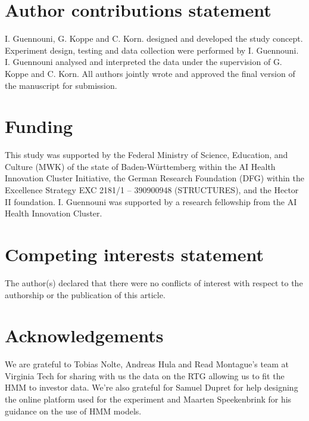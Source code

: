 \documentclass[
]{article}
\begin{document}
\pagebreak

\section*{Author contributions statement}\label{author-contributions-statement}

I. Guennouni, G. Koppe and C. Korn. designed and developed the study
concept. Experiment design, testing and data collection were performed
by I. Guennouni. I. Guennouni analysed and interpreted the data under
the supervision of G. Koppe and C. Korn. All authors jointly wrote and
approved the final version of the manuscript for submission.

\section*{Funding}\label{funding}

This study was supported by the Federal Ministry of Science, Education,
and Culture (MWK) of the state of Baden-Württemberg within the AI Health
Innovation Cluster Initiative, the German Research Foundation (DFG)
within the Excellence Strategy EXC 2181/1 -- 390900948 (STRUCTURES), and
the Hector II foundation. I. Guennouni was supported by a research
fellowship from the AI Health Innovation Cluster.

\section*{Competing interests statement}\label{competing-interests-statement}

The author(s) declared that there were no conflicts of interest with
respect to the authorship or the publication of this article.

\section*{Acknowledgements}\label{acknowledgements}

We are grateful to Tobias Nolte, Andreas Hula and Read Montague's team
at Virginia Tech for sharing with us the data on the RTG allowing us to
fit the HMM to investor data. We're also grateful for Samuel Dupret for
help designing the online platform used for the experiment and Maarten
Speekenbrink for his guidance on the use of HMM models.
\end{document}
